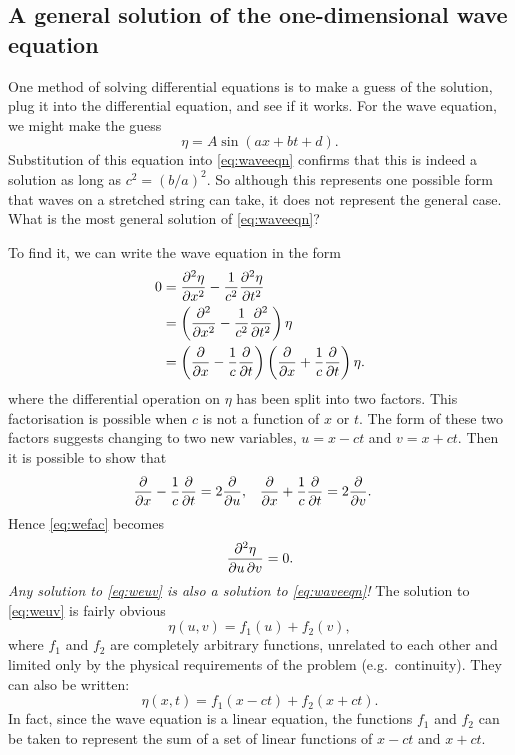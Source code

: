 \documentclass[11pt,twoside,a4paper]{article}
\begin{document}
\subsection{A general solution of the one-dimensional wave equation}

One method of solving differential equations is to make a guess of the
solution, plug it into the differential equation, and see if it works.
For the wave equation, we might make the guess
\begin{displaymath}
  \eta = A \sin(ax + bt + d).
\end{displaymath}
Substitution of this equation into \autoref{eq:waveeqn} confirms that
this is indeed a solution as long as $c^2 = (b/a)^2$.  So although
this represents one possible form that waves on a stretched string can
take, it does not represent the general case.  What is the most
general solution of \autoref{eq:waveeqn}?

To find it, we can write the wave equation in the form
\begin{align}
  0 &= \frac{\partial^2 {\eta}}{\partial {x}^2} - \frac{1}{c^2}\frac{\partial^2 {\eta}}{\partial {t}^2}\nonumber\\
    &= \left(\frac{\partial^2 {}}{\partial {x}^2} - \frac{1}{c^2}\frac{\partial^2 {}}{\partial {t}^2}\right)\eta\nonumber\\
  \label{eq:wefac}
    &= \left(\frac{\partial }{\partial x} - \frac{1}{c}\frac{\partial }{\partial t}\right)\left(\frac{\partial }{\partial x} + \frac{1}{c}\frac{\partial }{\partial t}\right)\eta.
\end{align}
where the differential operation on $\eta$ has been split into two
factors.  This factorisation is possible when $c$ is not a function of
$x$ or $t$.  The form of these two factors suggests changing to two
new variables, $u=x-ct$ and $v=x+ct$.  Then it is possible to show
that
\begin{align}
  \frac{\partial }{\partial x} - \frac{1}{c}\frac{\partial }{\partial t} &= 2\frac{\partial }{\partial u}, & 
                                                          \frac{\partial }{\partial x} + \frac{1}{c}\frac{\partial }{\partial t} &= 2\frac{\partial }{\partial v}.
\end{align}
Hence \autoref{eq:wefac} becomes
\begin{equation}
  \label{eq:weuv}
  \frac{\partial^2 {\eta}}{\partial {u}\,\partial {v}} = 0.
\end{equation}
\textit{Any solution to \autoref{eq:weuv} is also a solution to
  \autoref{eq:waveeqn}!} The solution to \autoref{eq:weuv} is fairly
obvious
\begin{displaymath}
  \eta(u,v) = f_1(u) + f_2(v),
\end{displaymath}
where $f_1$ and $f_2$ are completely arbitrary functions, unrelated to
each other and limited only by the physical requirements of the
problem (e.g.~continuity).  They can also be written:
\begin{equation}
  \label{eq:generalsoln}
  \eta(x,t) = f_1(x-ct) + f_2(x+ct).
\end{equation}
In fact, since the wave equation is a linear equation, the functions
$f_1$ and $f_2$ can be taken to represent the sum of a set of linear
functions of $x-ct$ and $x+ct$.
\end{document}
